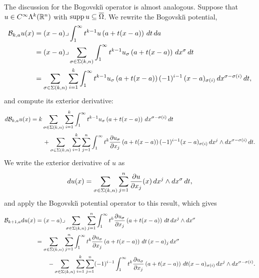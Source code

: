 \documentclass[10pt,a4paper]{article}
\begin{document}
The discussion for the Bogovski\u{\i} operator is almost analogous. 
Suppose that $u \in C^{\infty}\Lambda^{k}({\mathbb R}^n)$ with $\operatorname{supp} u \subseteq \overline\Omega$.
We rewrite the Bogovski\u{\i} potential,
\begin{align*}
    {\mathcal B}_{k,a} u(x) 
    &= 
    (x-a)\lrcorner \int_{1}^\infty t^{k-1} u\left(a+t(x-a)\right)\,dt\,da\;
    \\&
    = 
    (x-a)\lrcorner 
    \sum_{\sigma \in \Sigma(k,n)}
    \int_{1}^\infty 
    t^{k-1} u_{\sigma}\left(a+t(x-a)\right) \,dx^{\sigma} \,dt 
    \\&
    = 
    \sum_{\sigma \in \Sigma(k,n)} \sum_{i=1}^{k}
    \int_{1}^\infty 
    t^{k-1} u_{\sigma}\left(a+t(x-a)\right) (-1)^{i-1} \,(x-a)_{\sigma(i) } \,dx^{\sigma-\sigma(i)} \,dt 
    ,
\end{align*}
and compute its exterior derivative:
\begin{align*}
    d {\mathcal B}_{k,a} u(x) 
    &= 
    k 
    \sum_{\sigma \in \Sigma(k,n)} \sum_{i=1}^{k}
    \int_{1}^\infty 
    t^{k-1} u_{\sigma}\left(a+t(x-a)\right) \,dx^{\sigma-\sigma(i)} \,dt 
    \\&\qquad
    + 
    \sum_{\sigma \in \Sigma(k,n)} \sum_{i=1}^{k} \sum_{j=1}^{n}
    \int_{1}^\infty 
    t^{k} \frac{ \partial u_{\sigma} }{\partial x_{j}}\left(a+t(x-a)\right) (-1)^{i-1} (x-a)_{\sigma(i) } \,dx^{j} \wedge dx^{\sigma-\sigma(i)} \,dt 
    .
\end{align*}
We write the exterior derivative of $u$ as 
\begin{align*}
    d u(x)
    =
    \sum_{\sigma \in \Sigma(k,n)} \sum_{j=1}^{n}
    \frac{ \partial u }{\partial x_{j}}(x) \,dx^{j} \wedge dx^{\sigma} \,dt 
    ,
\end{align*}
and apply the Bogovski\u{\i} potential operator to this result, which gives 
\begin{align*}
    {\mathcal B}_{k+1,a} d u(x)
    &=
    (x-a)\lrcorner 
    \sum_{\sigma \in \Sigma(k,n)} \sum_{j=1}^{n}
    \int_{1}^\infty t^{k} \frac{ \partial u_{\sigma} }{\partial x_{j}}\left(a+t(x-a)\right) \,dt 
    \,dx^{j} \wedge dx^{\sigma}
    \\&
    = 
    \sum_{\sigma \in \Sigma(k,n)} \sum_{j=1}^{n}
    \int_{1}^\infty t^{k} \frac{ \partial u_{\sigma} }{\partial x_{j}}\left(a+t(x-a)\right) \,dt \,(x-a)_{j} \,dx^{\sigma}
    \\&\qquad 
    - 
    \sum_{\sigma \in \Sigma(k,n)} \sum_{i=1}^{k} \sum_{j=1}^{n}
    (-1)^{i-1}
    \int_{1}^\infty t^{k} \frac{ \partial u_{\sigma} }{\partial x_{j}}\left(a+t(x-a)\right) \,dt 
    (x-a)_{\sigma(i)} \,dx^{j} \wedge dx^{\sigma-\sigma(i)}
    .
\end{align*}
\end{document}
